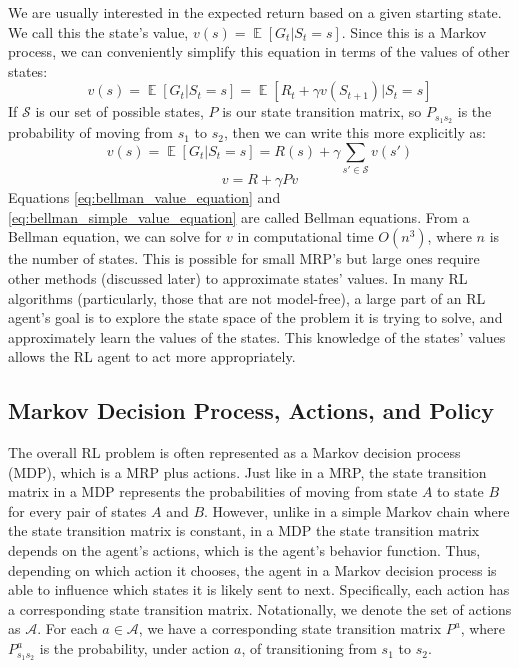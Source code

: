 \documentclass{article}
\DeclareMathOperator{\EX}{\mathbb{E}}
\begin{document}
We are usually interested in the expected return based on a given starting state. We call this the state’s value, $v(s) = \EX[G_t | S_t = s]$. Since this is a Markov process, we can conveniently simplify this equation in terms of the values of other states:
\begin{equation}\label{eq:state_value_definition}
v(s) = \EX[G_t | S_t = s] = \EX[R_t + \gamma v(S_{t+1}) | S_t = s]
\end{equation}
If $\mathcal{S}$ is our set of possible states, $P$ is our state transition matrix, so $P_{s_1s_2}$ is the probability of moving from $s_1$ to $s_2$, then we can write this more explicitly as:
\begin{equation}\label{eq:bellman_value_equation}
v(s) = \EX[G_t | S_t = s] = R(s) + \gamma\sum_{s'\in \mathcal{S}}v(s')
\end{equation}
\begin{equation}\label{eq:bellman_simple_value_equation}
v = R + \gamma Pv
\end{equation}
Equations \eqref{eq:bellman_value_equation} and \eqref{eq:bellman_simple_value_equation} are called Bellman equations. From a Bellman equation, we can solve for $v$ in computational time $O(n^3)$, where $n$ is the number of states. This is possible for small MRP’s but large ones require other methods (discussed later) to approximate states’ values. In many RL algorithms (particularly, those that are not model-free), a large part of an RL agent’s goal is to explore the state space of the problem it is trying to solve, and approximately learn the values of the states. This knowledge of the states’ values allows the RL agent to act more appropriately.

\subsection{Markov Decision Process, Actions, and Policy}

The overall RL problem is often represented as a Markov decision process (MDP), which is a MRP plus actions. Just like in a MRP, the state transition matrix in a MDP represents the probabilities of moving from state $A$ to state $B$ for every pair of states $A$ and $B$. However, unlike in a simple Markov chain where the state transition matrix is constant, in a MDP the state transition matrix depends on the agent’s actions, which is the agent’s behavior function. Thus, depending on which action it chooses, the agent in a Markov decision process is able to influence which states it is likely sent to next. Specifically, each action has a corresponding state transition matrix. Notationally, we denote the set of actions as $\mathcal{A}$. For each $a \in \mathcal{A}$, we have a corresponding state transition matrix $P^a$, where $P_{s_1s_2}^a$ is the probability, under action $a$, of transitioning from $s_1$ to $s_2$.
\end{document}
